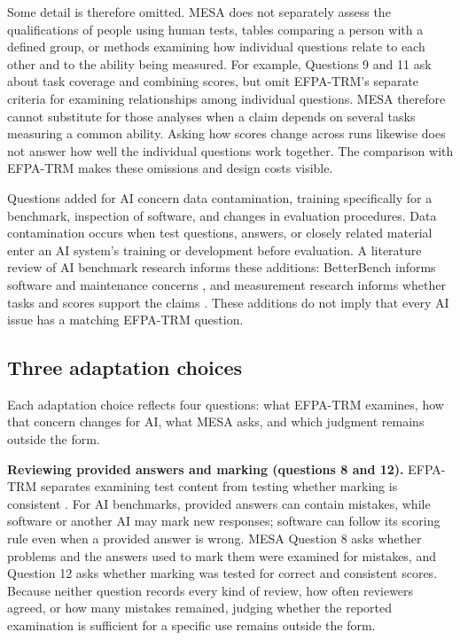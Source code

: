 \documentclass[10pt,conference]{IEEEtran}
\begin{document}
Some detail is therefore omitted. MESA does not separately assess the qualifications of people using human tests, tables comparing a person with a defined group, or methods examining how individual questions relate to each other and to the ability being measured. For example, Questions 9 and 11 ask about task coverage and combining scores, but omit EFPA-TRM's separate criteria for examining relationships among individual questions. MESA therefore cannot substitute for those analyses when a claim depends on several tasks measuring a common ability. Asking how scores change across runs likewise does not answer how well the individual questions work together. The comparison with EFPA-TRM makes these omissions and design costs visible.

Questions added for AI concern data contamination, training specifically for a benchmark, inspection of software, and changes in evaluation procedures. Data contamination occurs when test questions, answers, or closely related material enter an AI system's training or development before evaluation. A literature review of AI benchmark research informs these additions: BetterBench informs software and maintenance concerns \cite{reuel_betterbench}, and measurement research informs whether tasks and scores support the claims \cite{bean_measuring_what_matters}. These additions do not imply that every AI issue has a matching EFPA-TRM question.

\subsection{Three adaptation choices}
Each adaptation choice reflects four questions: what EFPA-TRM examines, how that concern changes for AI, what MESA asks, and which judgment remains outside the form.

\textbf{Reviewing provided answers and marking (questions 8 and 12).} EFPA-TRM separates examining test content from testing whether marking is consistent \cite{efpa_test_review_model_2025}. For AI benchmarks, provided answers can contain mistakes, while software or another AI may mark new responses; software can follow its scoring rule even when a provided answer is wrong. MESA Question 8 asks whether problems and the answers used to mark them were examined for mistakes, and Question 12 asks whether marking was tested for correct and consistent scores. Because neither question records every kind of review, how often reviewers agreed, or how many mistakes remained, judging whether the reported examination is sufficient for a specific use remains outside the form.
\end{document}
